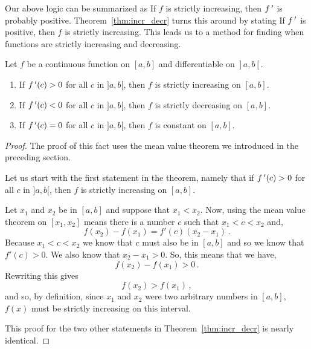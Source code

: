 Our above logic can be summarized as If $f$ is strictly  increasing, then $f\,'$ is probably  positive. Theorem~\ref{thm:incr_decr} turns this around by stating If $f\,'$ is positive, then $f$ is strictly increasing. This leads us to a method for finding when functions are strictly increasing and decreasing.

\begin{theorem}\label{thm:incr_decr}%
Let $f$ be a continuous function on $[a,b]$ and differentiable on $\left.\right]a,b\left[\right.$.
\begin{enumerate}
\item		If $f\,'(c) > 0$ for all $c$ in $]a,b[$, then $f$ is strictly increasing on $[a,b]$.
\item		If $f\,'(c) <0$ for all $c$ in $]a,b[$, then $f$ is strictly decreasing on $[a,b]$.
\item		If $f\,'(c) =0$ for all $c$ in $]a,b[$, then $f$ is constant on $[a,b]$.
\end{enumerate}
\end{theorem}


\ifanalysis

\begin{proof}
The proof of this fact uses the mean value theorem we introduced in the preceding section. 

Let us start with the first statement in the theorem, namely that if $f\,'(c) > 0$ for all $c$ in $]a,b[$, then $f$ is strictly increasing on $[a,b]$.

Let $x_1$ and $x_2$ be in $[a,b]$ and suppose that $x_1<x_2$. Now, using the mean value theorem on $[x_1,x_2]$ means there is a number $c$ such that $x_1<c<x_2$ and,
$$
f\left( {{x_2}} \right) - f\left( {{x_1}} \right) = f'\left( c \right)\left( {{x_2} - {x_1}} \right)\,.
$$
Because $x_1<c<x_2$ we know that $c$ must also be in $[a,b]$ and so we know that $f'(c)>0$. We also know that $x_2-x_1>0$. So, this means that we have,
$$
f\left( {{x_2}} \right) - f\left( {{x_1}} \right) > 0\,.
$$
Rewriting this gives
$$
f\left( {{x_2}} \right) > f\left( {{x_1}} \right)\,,
$$
and so, by definition, since $x_1$ and $x_2$ were two arbitrary numbers in $[a,b]$, $f(x)$ must be strictly increasing on this interval.

This proof for the two other statements in Theorem~\ref{thm:incr_decr} is nearly identical. 
\end{proof}

\fi


